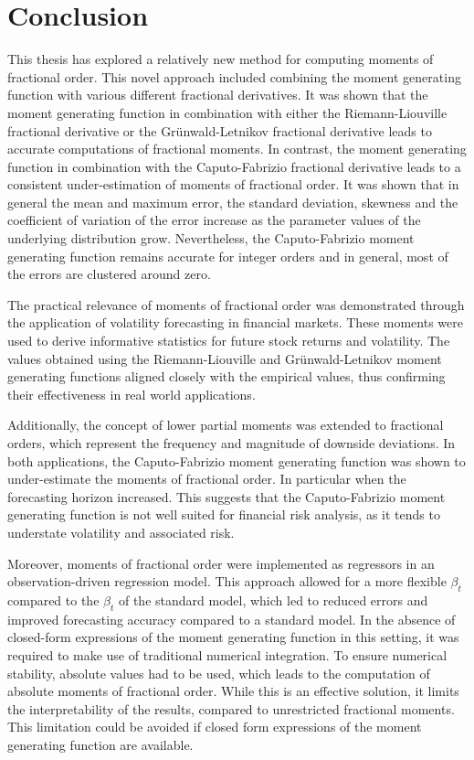 \section{Conclusion}\label{s:con}
This thesis has explored a relatively new method for computing moments of fractional order. This novel approach included combining the moment generating function with various different fractional derivatives. It was shown that the moment generating function in combination with either the Riemann-Liouville fractional derivative or the Grünwald-Letnikov fractional derivative leads to accurate computations of fractional moments. In contrast, the moment generating function in combination with the Caputo-Fabrizio fractional derivative leads to a consistent under-estimation of moments of fractional order.
It was shown that in general the mean and maximum error, the standard deviation, skewness and the coefficient of variation of the error increase as the parameter values of the underlying distribution grow. Nevertheless, the Caputo-Fabrizio moment generating function remains accurate for integer orders and in general, most of the errors are clustered around zero. 

The practical relevance of moments of fractional order was demonstrated through the application of volatility forecasting in financial markets. These moments were used to derive informative statistics for future stock returns and volatility. The values obtained using the Riemann-Liouville and Grünwald-Letnikov moment generating functions aligned closely with the empirical values, thus confirming their effectiveness in real world applications.

Additionally, the concept of lower partial moments was extended to fractional orders, which represent the frequency and magnitude of downside deviations. In both applications, the Caputo-Fabrizio moment generating function was shown to under-estimate the moments of fractional order. In particular when the forecasting horizon increased. This suggests that the Caputo-Fabrizio moment generating function is not well suited for financial risk analysis, as it tends to understate volatility and associated risk. 

Moreover, moments of fractional order were implemented as regressors in an observation-driven regression model. This approach allowed for a more flexible \(\beta_t\) compared to the \(\beta_t\) of the standard model, which led to reduced errors and improved forecasting accuracy compared to a standard model. In the absence of closed-form expressions of the moment generating function in this setting, it was required to make use of traditional numerical integration. To ensure numerical stability, absolute values had to be used, which leads to the computation of absolute moments of fractional order. While this is an effective solution, it limits the interpretability of the results, compared to unrestricted fractional moments. This limitation could be avoided if closed form expressions of the moment generating function are available.
\newline

